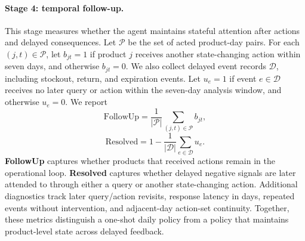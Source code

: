\paragraph{Stage 4: temporal follow-up.}
This stage measures whether the agent maintains stateful attention after actions and delayed consequences. Let $\mathcal{P}$ be the set of acted product-day pairs. For each $(j,t)\in\mathcal{P}$, let $b_{jt}=1$ if product $j$ receives another state-changing action within seven days, and otherwise $b_{jt}=0$. We also collect delayed event records $\mathcal{D}$, including stockout, return, and expiration events. Let $u_e=1$ if event $e\in\mathcal{D}$ receives no later query or action within the seven-day analysis window, and otherwise $u_e=0$. We report
\begin{equation}
\mathrm{FollowUp}
=\frac{1}{|\mathcal{P}|}\sum_{(j,t)\in\mathcal{P}} b_{jt},
\end{equation}
\begin{equation}
\mathrm{Resolved}
=1-\frac{1}{|\mathcal{D}|}\sum_{e\in\mathcal{D}}u_e.
\end{equation}
\textbf{FollowUp} captures whether products that received actions remain in the operational loop. \textbf{Resolved} captures whether delayed negative signals are later attended to through either a query or another state-changing action. Additional diagnostics track later query/action revisits, response latency in days, repeated events without intervention, and adjacent-day action-set continuity. Together, these metrics distinguish a one-shot daily policy from a policy that maintains product-level state across delayed feedback.
